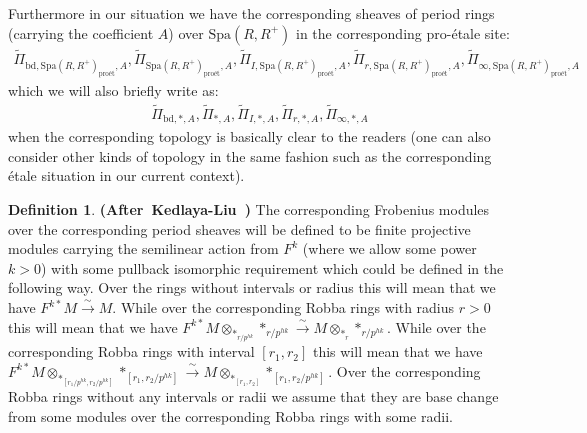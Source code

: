 \documentclass[12pt]{amsart}
\theoremstyle{definition}
\newtheorem{definition}[theorem]{Definition}
\numberwithin{equation}{section}
\begin{document}
\indent Furthermore in our situation we have the corresponding sheaves of period rings (carrying the coefficient $A$) over $\mathrm{Spa}(R,R^+)$ in the corresponding pro-\'etale site:
\begin{align}
\widetilde{\Pi}_{\mathrm{bd},\mathrm{Spa}(R,R^+)_\text{pro\'et},A}, \widetilde{\Pi}_{\mathrm{Spa}(R,R^+)_\text{pro\'et},A}, \widetilde{\Pi}_{I,\mathrm{Spa}(R,R^+)_\text{pro\'et},A}, \widetilde{\Pi}_{r,\mathrm{Spa}(R,R^+)_\text{pro\'et},A}, \widetilde{\Pi}_{\infty,\mathrm{Spa}(R,R^+)_\text{pro\'et},A}	
\end{align}
which we will also briefly write as:
\begin{align}
\widetilde{\Pi}_{\mathrm{bd},*,A}, \widetilde{\Pi}_{*,A}, \widetilde{\Pi}_{I,*,A}, \widetilde{\Pi}_{r,*,A}, \widetilde{\Pi}_{\infty,*,A}	
\end{align}
when the corresponding topology is basically clear to the readers (one can also consider other kinds of topology in the same fashion such as the corresponding \'etale situation in our current context).



\begin{definition} \mbox{\bf{(After Kedlaya-Liu \cite[Definition 4.4.4]{KL2})}} The corresponding Frobenius modules over the corresponding period sheaves will be defined to be finite projective modules carrying the semilinear action from $F^k$ (where we allow some power $k>0$) with some pullback isomorphic requirement which could be defined in the following way. Over the rings without intervals or radius this will mean that we have $F^{k*}M\overset{\sim}{\rightarrow}M$. While over the corresponding Robba rings with radius $r>0$ this will mean that we have $F^{k*}M\otimes_{*_{r/p^{hk}}} *_{r/p^{hk}}\overset{\sim}{\rightarrow}M\otimes_{*_r}*_{r/p^{hk}}$. While over the corresponding Robba rings with interval $[r_1,r_2]$ this will mean that we have $F^{k*}M\otimes_{*_{[r_1/p^{hk},r_2/p^{hk}]}} *_{[r_1,r_2/p^{hk}]}\overset{\sim}{\rightarrow}M\otimes_{*_{[r_1,r_2]}}*_{[r_1,r_2/p^{hk}]}$. Over the corresponding Robba rings without any intervals or radii we assume that they are base change from some modules over the corresponding Robba rings with some radii. 
	
\end{definition}



\end{document}
